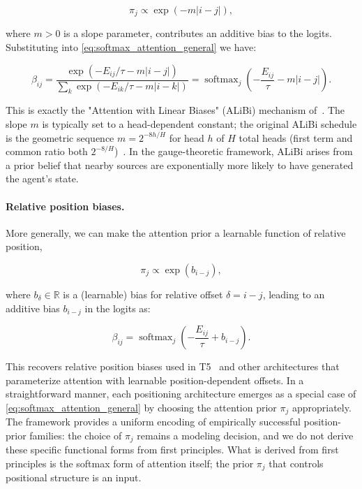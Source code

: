 \documentclass[11pt]{article}
\begin{document}
\begin{equation}
\pi_j \propto \exp(-m|i - j|),
\label{eq:alibi_prior}
\end{equation}

where $m > 0$ is a slope parameter, contributes an additive bias to the logits. Substituting into \eqref{eq:softmax_attention_general} we have:

\begin{equation}
\beta_{ij} = \frac{\exp(-E_{ij}/\tau - m|i-j|)}{\sum_k \exp(-E_{ik}/\tau - m|i-k|)} = \operatorname{softmax}_j\left(-\frac{E_{ij}}{\tau} - m|i - j|\right).
\label{eq:alibi_attention}
\end{equation}

This is exactly the "Attention with Linear Biases" (ALiBi) mechanism of~\cite{press2022train}. The slope $m$ is typically set to a head-dependent constant; the original ALiBi schedule is the geometric sequence $m = 2^{-8h/H}$ for head $h$ of $H$ total heads (first term and common ratio both $2^{-8/H}$)~\cite{press2022train}. In the gauge-theoretic framework, ALiBi arises from a prior belief that nearby sources are exponentially more likely to have generated the agent's state.

\paragraph{Relative position biases.}
More generally, we can make the attention prior a learnable function of relative position,

\begin{equation}
\pi_j \propto \exp(b_{i-j}),
\label{eq:relative_bias_prior}
\end{equation}

where $b_\delta \in \mathbb{R}$ is a (learnable) bias for relative offset $\delta = i - j$, leading to an additive bias $b_{i-j}$ in the logits as:

\begin{equation}
\beta_{ij} = \operatorname{softmax}_j\left(-\frac{E_{ij}}{\tau} + b_{i-j}\right).
\label{eq:relative_bias_attention}
\end{equation}

This recovers relative position biases used in T5~\cite{raffel2020exploring} and other architectures that parameterize attention with learnable position-dependent offsets. In a straightforward manner, each positioning architecture emerges as a special case of \eqref{eq:softmax_attention_general} by choosing the attention prior $\pi_j$ appropriately. The framework provides a uniform encoding of empirically successful position-prior families: the choice of $\pi_j$ remains a modeling decision, and we do not derive these specific functional forms from first principles. What is derived from first principles is the softmax form of attention itself; the prior $\pi_j$ that controls positional structure is an input.
\end{document}
